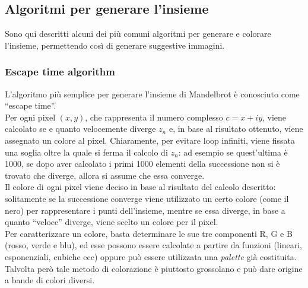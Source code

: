 \documentclass[10pt]{report}
\begin{document}
			\subsection{Algoritmi per generare l'insieme}
				Sono qui descritti alcuni dei più comuni algoritmi per generare e colorare l'insieme, permettendo così di generare suggestive immagini.
				\subsubsection{Escape time algorithm}
					L'algoritmo più semplice per generare l'insieme di Mandelbrot è conosciuto come ``escape time''. \\
					Per ogni pixel $(x, y)$, che rappresenta il numero complesso $c = x + i y$, viene calcolato se e quanto velocemente diverge $z_n$ e, in base al risultato ottenuto, viene assegnato un colore al pixel.
					Chiaramente, per evitare loop infiniti, viene fissata una soglia oltre la quale si ferma il calcolo di $z_n$: ad esempio se quest'ultima è 1000, se dopo aver calcolato i primi 1000 elementi della successione non si è trovato che diverge, allora si assume che essa converge.\\
					Il colore di ogni pixel viene deciso in base al risultato del calcolo descritto: solitamente se la successione converge viene utilizzato un certo colore (come il nero) per rappresentare i punti dell'insieme, mentre se essa diverge, in base a quanto ``veloce'' diverge, viene scelto un colore per il pixel.\\
					Per caratterizzare un colore, basta determinare le sue tre componenti R, G e B (rosso, verde e blu), ed esse possono essere calcolate a partire da funzioni (lineari, esponenziali, cubiche ecc) oppure può essere utilizzata una \textit{palette} già costituita.\\
					Talvolta però tale metodo di colorazione è piuttosto grossolano e può dare origine a bande di colori diversi.
\end{document}
